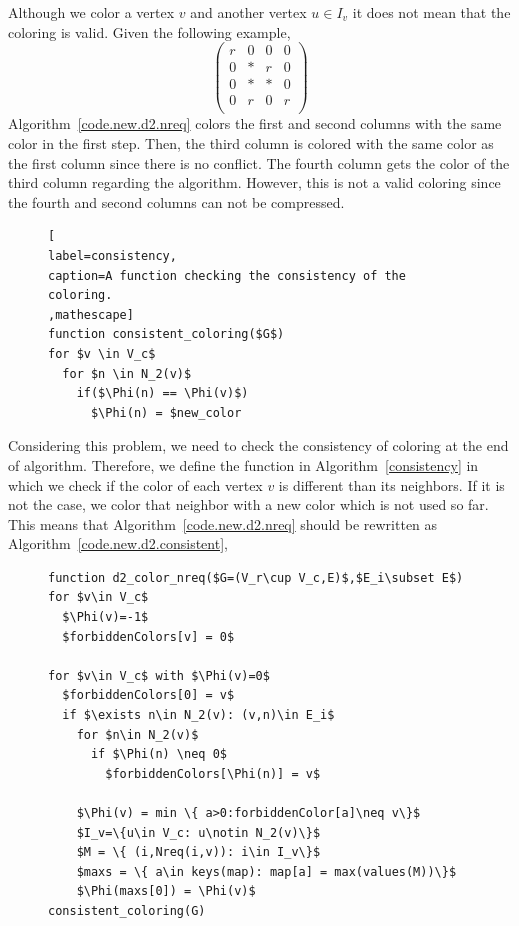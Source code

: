 \documentclass[12pt, twoside,a4paper,toc=bibliography]{scrbook}
\newcommand{\coderef}[1]{Algorithm~\protect\ref{#1}}
\begin{document}
Although we color a vertex $v$ and another vertex $u\in I_v$
it does not mean that the coloring is valid.
Given the following example,
\begin{equation}
\left(\begin{array}{cccc}
r & 0 & 0 & 0  \\
0 & * & r & 0 \\
0 & * & * & 0 \\
0 & r & 0 & r \\
\end{array}\right)
\label{twocolorings2}
\end{equation}
\coderef{code.new.d2.nreq} colors the first and second columns with the same color
in the first step. Then, the third column is colored with the same color as the
first column since there is no conflict. The fourth column gets the color of
the third column regarding the algorithm. However, this is not a valid coloring
since the fourth and second columns can not be compressed.
\begin{figure}
\begin{lstlisting}[
label=consistency,
caption=A function checking the consistency of the coloring.
,mathescape]
function consistent_coloring($G$)
for $v \in V_c$
  for $n \in N_2(v)$
    if($\Phi(n) == \Phi(v)$)
      $\Phi(n) = $new_color
\end{lstlisting}
\end{figure}

Considering this problem, we need to check the consistency of coloring
at the end of algorithm. Therefore, we define the function in \coderef{consistency} in which
we check if the color of each vertex $v$ is different than its neighbors.
If it is not the case, we color that neighbor with a new color which is not used so far.
This means that \coderef{code.new.d2.nreq} should be rewritten as \coderef{code.new.d2.consistent},
\begin{figure}
\begin{lstlisting}[caption=New coloring heuristic for distance-$2$ coloring
considering the nonrequired elements and checking the consistency.,
label=code.new.d2.consistent,mathescape]
function d2_color_nreq($G=(V_r\cup V_c,E)$,$E_i\subset E$)
for $v\in V_c$
  $\Phi(v)=-1$
  $forbiddenColors[v] = 0$

for $v\in V_c$ with $\Phi(v)=0$
  $forbiddenColors[0] = v$
  if $\exists n\in N_2(v): (v,n)\in E_i$
    for $n\in N_2(v)$
      if $\Phi(n) \neq 0$
        $forbiddenColors[\Phi(n)] = v$

    $\Phi(v) = min \{ a>0:forbiddenColor[a]\neq v\}$
    $I_v=\{u\in V_c: u\notin N_2(v)\}$
    $M = \{ (i,Nreq(i,v)): i\in I_v\}$
    $maxs = \{ a\in keys(map): map[a] = max(values(M))\}$
    $\Phi(maxs[0]) = \Phi(v)$
consistent_coloring(G)
\end{lstlisting}
\end{figure}
\end{document}
